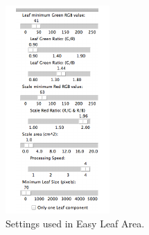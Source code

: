 \documentclass[jou,floatsintext]{apa6}
\begin{document}
\begin{figure}[!h]
\includegraphics[width=\textwidth]{../Figures/settings_used} \caption{Settings used in Easy Leaf Area.}\label{fig:leafarea}
\end{figure}
\end{document}
